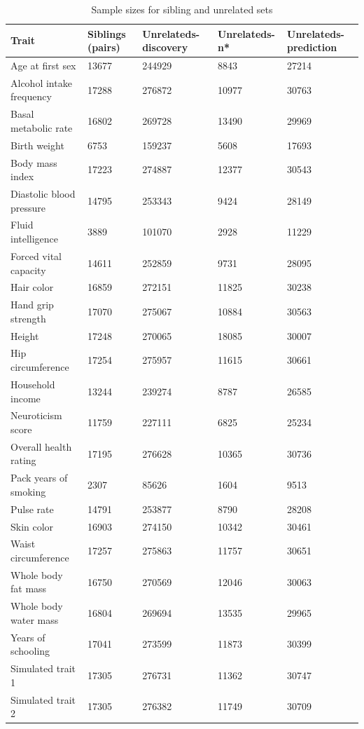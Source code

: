 \documentclass[hidelinks, 12pt]{article}
\begin{document}
\begin{table}[h!]
\caption{Sample sizes for sibling and unrelated sets}
\begin{center}
\small
 \begin{tabular}{| l l l l l |} 
 \hline
 \textbf{Trait} & \textbf{Siblings (pairs)} & \textbf{Unrelateds-discovery} & \textbf{Unrelateds-n*} & \textbf{Unrelateds-prediction}\\ [0.5ex] 
 \hline\hline
  Age at first sex & 13677 & 244929 & 8843 & 27214 \\
Alcohol intake frequency & 17288 & 276872 & 10977 & 30763 \\
Basal metabolic rate & 16802 & 269728 & 13490 & 29969 \\
Birth weight & 6753 & 159237 & 5608 & 17693 \\
Body mass index & 17223 & 274887 & 12377 & 30543 \\
Diastolic blood pressure & 14795 & 253343 & 9424 & 28149 \\
Fluid intelligence & 3889 & 101070 & 2928 & 11229 \\
Forced vital capacity & 14611 & 252859 & 9731 & 28095 \\
Hair color & 16859 & 272151 & 11825 & 30238 \\
Hand grip strength & 17070 & 275067 & 10884 & 30563 \\
Height & 17248 & 270065 & 18085 & 30007 \\
Hip circumference & 17254 & 275957 & 11615 & 30661 \\
Household income & 13244 & 239274 & 8787 & 26585 \\
Neuroticism score & 11759 & 227111 & 6825 & 25234 \\
Overall health rating & 17195 & 276628 & 10365 & 30736 \\
Pack years of smoking & 2307 & 85626 & 1604 & 9513 \\
Pulse rate & 14791 & 253877 & 8790 & 28208 \\
Skin color & 16903 & 274150 & 10342 & 30461 \\
Waist circumference & 17257 & 275863 & 11757 & 30651 \\
Whole body fat mass & 16750 & 270569 & 12046 & 30063 \\
Whole body water mass & 16804 & 269694 & 13535 & 29965 \\
Years of schooling & 17041 & 273599 & 11873 & 30399 \\
   \hline\hline
Simulated trait 1 & 17305 & 276731 & 11362 & 30747 \\
Simulated trait 2 & 17305 & 276382 & 11749 & 30709 \\
   \hline
 \end{tabular}
\end{center}
\end{table}
\end{document}

